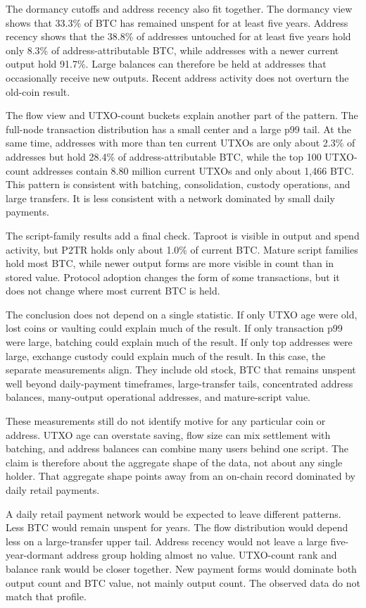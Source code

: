 \documentclass[conference]{IEEEtran}
\begin{document}
The dormancy cutoffs and address recency also fit together. The dormancy
view shows that 33.3\% of BTC has remained unspent for at least five years.
Address recency shows that the 38.8\% of addresses untouched for at least
five years hold only 8.3\% of address-attributable BTC, while addresses with
a newer current output hold 91.7\%. Large balances can therefore be held at
addresses that occasionally receive new outputs. Recent address activity does
not overturn the old-coin result.

The flow view and UTXO-count buckets explain another part of the pattern.
The full-node transaction distribution has a small center and a large p99
tail. At the same time, addresses with more than ten current UTXOs are only
about 2.3\% of addresses but hold 28.4\% of address-attributable BTC, while
the top 100 UTXO-count addresses contain 8.80 million current UTXOs and only
about 1{,}466 BTC. This pattern is consistent with batching, consolidation,
custody operations, and large transfers. It is less consistent with a
network dominated by small daily payments.

The script-family results add a final check. Taproot is visible in output
and spend activity, but P2TR holds only about 1.0\% of current BTC. Mature
script families hold most BTC, while newer output forms are more visible in
count than in stored value. Protocol adoption changes the form of some
transactions, but it does not change where most current BTC is held.

The conclusion does not depend on a single statistic. If only UTXO age were
old, lost coins or vaulting could explain much of the result. If only
transaction p99 were large, batching could explain much of the result. If
only top addresses were large, exchange custody could explain much of the
result. In this case, the separate measurements align. They include old stock, BTC that
remains unspent well beyond daily-payment timeframes, large-transfer tails,
concentrated address balances, many-output operational addresses, and
mature-script value.

These measurements still do not identify motive for any particular coin or
address. UTXO age can overstate saving, flow size can mix settlement with
batching, and address balances can combine many users behind one script. The
claim is therefore about the aggregate shape of the data, not about any
single holder. That aggregate shape points away from an on-chain record
dominated by daily retail payments.

A daily retail payment network would be expected to leave different
patterns. Less BTC would remain unspent for years. The flow distribution
would depend less on a large-transfer upper tail. Address recency would not
leave a large five-year-dormant address group holding almost no value.
UTXO-count rank and balance rank would be closer together. New payment forms
would dominate both output count and BTC value, not mainly output count. The
observed data do not match that profile.
\end{document}
